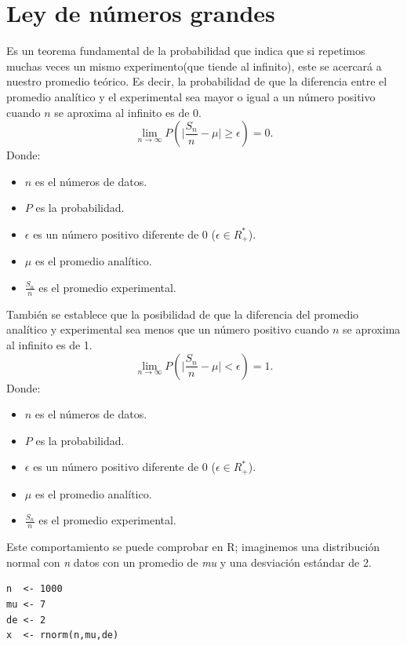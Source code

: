 \documentclass[]{article}
\begin{document}
\section{Ley de números grandes}
Es un teorema fundamental de la probabilidad que indica que si repetimos muchas veces un mismo experimento(que tiende al infinito), este se acercará a nuestro promedio teórico.
Es decir, la probabilidad de que la diferencia entre el promedio analítico y el experimental sea mayor o igual a un número positivo cuando $n$ se aproxima al infinito es de $0$.
\[ \lim_{n\to\infty} P(\lvert \frac{S_{n}}{n} - \mu \lvert \geq \epsilon) = 0.\]
Donde:
\begin{itemize}
	\item $n$ es el números de datos.
	\item $P$ es la probabilidad.
	\item $\epsilon$ es un número positivo diferente de 0 ($\epsilon \in R_{+}^{*}$).
    \item $\mu$ es el promedio analítico.
	\item $\frac{S_{n}}{n}$ es el promedio experimental.
\end{itemize}
También se establece que la posibilidad de que la diferencia del promedio analítico y experimental sea menos que un número positivo cuando $n$ se aproxima al infinito es de 1.
\[ \lim_{n\to\infty} P(\lvert \frac{S_{n}}{n} - \mu \lvert < \epsilon) = 1.\]
Donde:
\begin{itemize}
	\item $n$ es el números de datos.
	\item $P$ es la probabilidad.
	\item $\epsilon$ es un número positivo diferente de 0 ($\epsilon \in R_{+}^{*}$).
    \item $\mu$ es el promedio analítico.
	\item $\frac{S_{n}}{n}$ es el promedio experimental.
\end{itemize}

Este comportamiento se puede comprobar en R\cite{rproject}; imaginemos una distribución normal con \textit{n} datos con un promedio de \textit{mu} y una desviación estándar de 2.
  \begin{lstlisting}
n  <- 1000
mu <- 7
de <- 2
x  <- rnorm(n,mu,de)
   \end{lstlisting}
   
\end{document}
